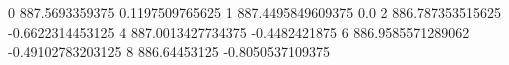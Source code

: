 0 887.5693359375 0.1197509765625
1 887.4495849609375 0.0
2 886.787353515625 -0.6622314453125
4 887.0013427734375 -0.4482421875
6 886.9585571289062 -0.49102783203125
8 886.64453125 -0.8050537109375
